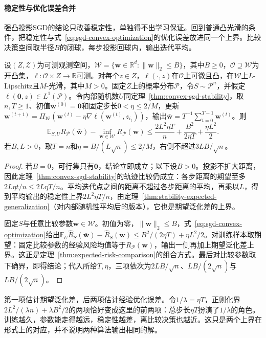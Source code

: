 \paragraph{稳定性与优化误差合并}

强凸投影SGD的结论只改善稳定性，单独得不出学习保证。回到普通凸光滑的条件，把稳定性与式~\eqref{eq:sgd-convex-optimization}的优化误差放进同一个上界。比较决策空间取半径$B$的闭球，每步投影回球内，输出迭代平均。

\begin{theorem}[平均投影SGD的期望风险保证]
\label{thm:averaged-sgd-learning}
设$(Z,\mathcal Z)$为可测观测空间，$\mathcal W=\{\bm w\in\mathbb R^d:\|\bm w\|_2\leq B\}$，其中$B\geq0$，$\mathcal O\supseteq\mathcal W$为开凸集，$\ell:\mathcal O\times Z\to\mathbb R$可测。对每个$z\in Z$，$\ell(\cdot,z)$在$\mathcal O$上可微且凸，在$\mathcal W$上$L$-Lipschitz且$M$-光滑，其中$M>0$。固定$Z$上的概率分布$\mathcal P$，令$S\sim\mathcal P^n$，并假定$\ell(\bm 0,z)\in L^1(\mathcal P)$。令内部随机数$U$同定理~\ref{thm:convex-sgd-stability}，取$n,T\geq1$、初值$\bm w^{(0)}=\bm 0$和固定步长$0<\eta\leq2/M$，更新$\bm w^{(t+1)}=\Pi_{\mathcal W}(\bm w^{(t)}-\eta\nabla\ell(\bm w^{(t)},z_{i_t}))$，输出$\bar{\bm w}=T^{-1}\sum_{t=0}^{T-1}\bm w^{(t)}$。则
\[
 \mathbb E_{S,U}R_{\mathcal P}(\bar{\bm w})-\inf_{\bm w\in\mathcal W}R_{\mathcal P}(\bm w)
 \leq\frac{2L^2\eta T}{n}+\frac{B^2}{2\eta T}+\frac{\eta L^2}{2}.
\]
若$B,L>0$，取$T=n$和$\eta=B/(L\sqrt n)\leq2/M$，右侧不超过$3LB/\sqrt n$。
\end{theorem}
\begin{proof}
若$B=0$，可行集只有$\bm 0$，结论立即成立；以下设$B>0$。投影不扩大距离，因此定理~\ref{thm:convex-sgd-stability}的轨迹比较仍成立：各步距离的期望至多$2L\eta t/n\leq2L\eta T/n$。平均迭代点之间的距离不超过各步距离的平均，再乘以$L$，得到平均输出的稳定性上界$2L^2\eta T/n$，由定理~\ref{thm:stability-expected-generalization}（对内部随机性平均后的版本），它也是期望泛化差的上界。

固定$S$与任意比较参数$\bm w\in\mathcal W$。初值为零，$\|\bm w\|_2\leq B$，式~\eqref{eq:sgd-convex-optimization}给出$\mathbb E_U\hat R_S(\bar{\bm w})-\hat R_S(\bm w)\leq B^2/(2\eta T)+\eta L^2/2$。对训练样本取期望：固定比较参数的经验风险均值等于$R_{\mathcal P}(\bm w)$，输出一侧再加上期望泛化差上界。这正是定理~\ref{thm:expected-risk-comparison}的组合方式。最后对比较参数取下确界，即得结论；代入所给$T,\eta$，三项依次为$2LB/\sqrt n$、$LB/(2\sqrt n)$与$LB/(2\sqrt n)$。
\end{proof}

第一项估计期望泛化差，后两项估计经验优化误差。令$1/\lambda=\eta T$，正则化界$2L^2/(\lambda n)+\lambda B^2/2$的两项恰好变成这里的前两项：总步长$\eta T$扮演了$1/\lambda$的角色。训练越久，参数能走得越远，稳定性越差，离比较决策也越近。这只是两个上界在形式上的对应，并不说明两种算法输出相同的解。


